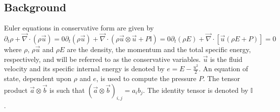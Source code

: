 \documentclass[preprint,10pt]{elsarticle}
\renewcommand{\div}{\vec{\nabla}\! \cdot \!}
\begin{document}
\subsection{Background} \label{sec:background}

Euler equations in conservative form are given by
\begin{subequations}
\label{eq:euler_eq}
%
\begin{equation}
\partial_t \rho  + \div \left( \rho \vec{u} \right) = 0
\end{equation}
%
\begin{equation}
\partial_t \left( \rho \vec{u} \right) + \div \left( \rho \vec{u} \otimes \vec{u} + P \mathbb{I} \right) = 0 
\end{equation}
%
\begin{equation}
\partial_t \left( \rho E \right) + \div \left[ \vec{u} \left( \rho E + P \right) \right] = 0
\end{equation}
\end{subequations}
%
where $\rho$, $\rho \vec{u}$ and $\rho E$ are the density, the momentum and the total specific energy, 
respectively, and will be referred to as the conservative variables. $\vec{u}$ is the fluid velocity and 
its specific internal energy is denoted by $e=E-\tfrac{u^2}{2}$. An equation of state, dependent upon 
$\rho$ and $e$, is used to compute the pressure $P$. The tensor product $\vec{a} \otimes \vec{b}$ is 
such that $(\vec{a} \otimes \vec{b})_{i,j} = a_i b_j$. The identity tensor is denoted by $\mathbb{I}$.
\end{document}
